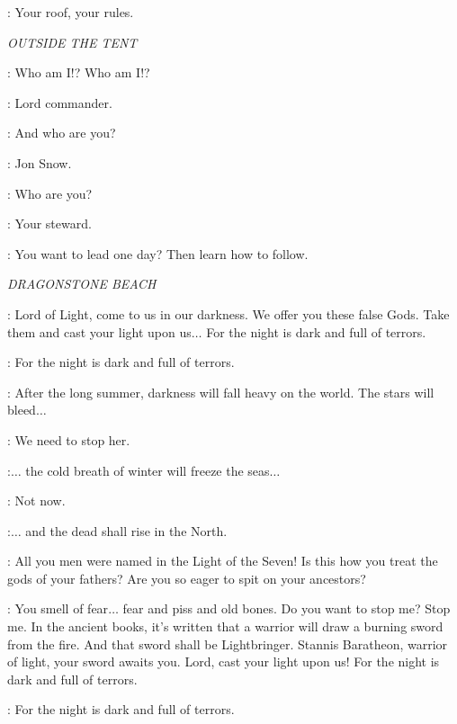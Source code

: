 \JEOR: Your roof, your rules.


\scene

\textit{OUTSIDE THE TENT}

\JEOR: Who am I!? Who am I!?

\JON: Lord commander.

\JEOR: And who are you?

\JON: Jon Snow.

\JEOR: Who are you?

\JON: Your steward.

\JEOR: You want to lead one day? Then learn how to follow.


\scene

\textit{DRAGONSTONE BEACH}


\MELISANDRE: Lord of Light, come to us in our darkness. We offer you these false Gods. Take them and cast your light upon us$\ldots$ For the night is dark and full of terrors.

\CROWD: For the night is dark and full of terrors.

\MELISANDRE: After the long summer, darkness will fall heavy on the world. The stars will bleed$\ldots$

\CRESSEN:  We need to stop her.

\MELISANDRE:$\ldots$ the cold breath of winter will freeze the seas$\ldots$

\DAVOS: Not now.

\MELISANDRE:$\ldots$ and the dead shall rise in the North.

\CRESSEN:  All you men were named in the Light of the Seven! Is this how you treat the gods of your fathers? Are you so eager to spit on your ancestors?

\MELISANDRE: You smell of fear$\ldots$ fear and piss and old bones. Do you want to stop me? Stop me. In the ancient books, it's written that a warrior will draw a burning sword from the fire. And that sword shall be Lightbringer. Stannis Baratheon, warrior of light, your sword awaits you.  Lord, cast your light upon us! For the night is dark and full of terrors.

\STANNIS: For the night is dark and full of terrors.


